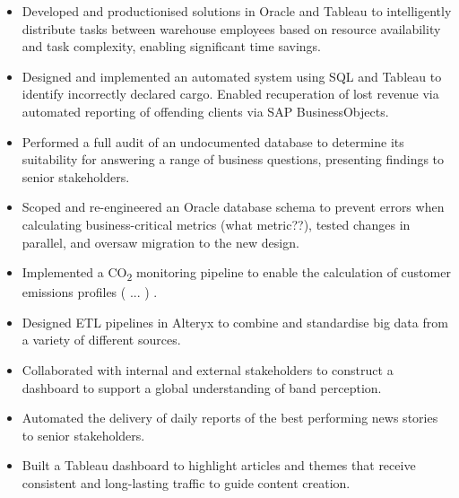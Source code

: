 \documentclass[10pt,a4paper,ragged2e,withhyper]{altacv}
\begin{document}
\begin{paracol}{2}
\begin{itemize}
\medskip
{}

\end{itemize}

\divider

\begin{itemize}
\item Developed and productionised solutions in Oracle and Tableau to intelligently distribute tasks between warehouse employees based on resource availability and task complexity, enabling significant time savings.
\item Designed and implemented an automated system using SQL and Tableau to identify incorrectly declared cargo. Enabled recuperation of lost revenue via automated reporting of offending clients via SAP BusinessObjects.
\item Performed a full audit of an undocumented database to determine its suitability for answering a range of business questions, presenting findings to senior stakeholders.
\item Scoped and re-engineered an Oracle database schema to prevent errors when calculating business-critical metrics (what metric??), tested changes in parallel, and oversaw migration to the new design.
\item Implemented a CO\textsubscript{2} monitoring pipeline to enable the calculation of customer emissions profiles ( ... ) .

\medskip
{}

\end{itemize}

\divider

\begin{itemize}
\item Designed ETL pipelines in Alteryx to combine and standardise big data from a variety of different sources.
\item Collaborated with internal and external stakeholders to construct a dashboard to support a global understanding of band perception. 
\item Automated the delivery of daily reports of the best performing news stories to senior stakeholders.
\item Built a Tableau dashboard to highlight articles and themes that receive consistent and long-lasting traffic to guide content creation.


\end{itemize}
\end{paracol}
\end{document}
